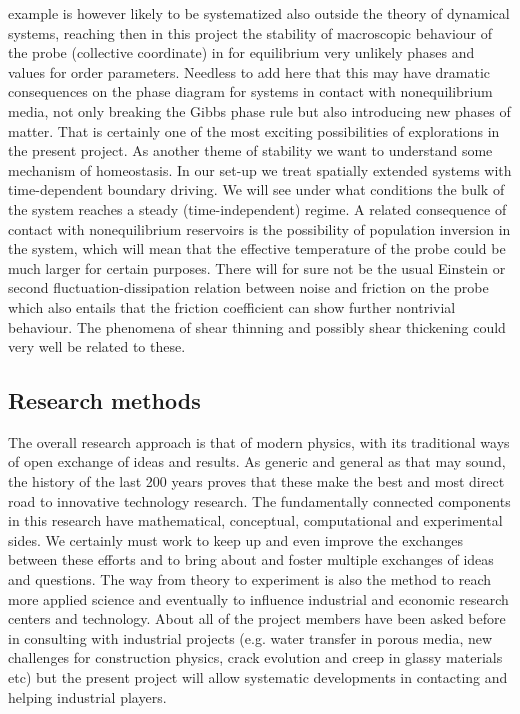 example is however likely to be systematized also outside the theory of dynamical systems,
reaching then in this project the stability of macroscopic behaviour of the probe
(collective coordinate) in for equilibrium very unlikely phases and values for order
parameters.  Needless to add here that this may have dramatic consequences on the phase
diagram for systems in contact with nonequilibrium media, not only breaking the Gibbs phase
rule but also introducing new phases of matter.  That is certainly one of the most exciting
possibilities of explorations in the present project. As another theme of stability we want
to understand some mechanism of homeostasis. In our set-up we treat spatially extended
systems with time-dependent boundary driving. We will see under what conditions the bulk of
the system reaches a steady (time-independent) regime. A related consequence of contact with
nonequilibrium reservoirs is the possibility of population inversion in the system, which
will mean that the effective temperature of the probe could be much larger for certain
purposes.  There will for sure not be the usual Einstein or second fluctuation-dissipation
relation between noise and friction on the probe which also entails that the friction
coefficient can show further nontrivial behaviour.  The phenomena of shear thinning and
possibly shear thickening could very well be related to these.
%


\subsection{Research methods}\label{sec:methods}

The overall research approach is that of modern physics, with its traditional ways of open
exchange of ideas and results.  As generic and general as that may sound, the history of the
last 200 years proves that these make the best and most direct road to innovative technology
research.  The fundamentally connected components in this research have mathematical,
conceptual, computational and experimental sides.
%
We certainly must work to keep up and even improve the exchanges between these efforts and
to bring about and foster multiple exchanges of ideas and questions.  The way from theory to
experiment is also the method to reach more applied science and eventually to influence
industrial and economic research centers and technology.  About all of the project members
have been asked before in consulting with industrial projects (e.g. water transfer in porous
media, new challenges for construction physics, crack evolution and creep in glassy
materials etc) but the present project will allow systematic developments in contacting and
helping industrial players.


